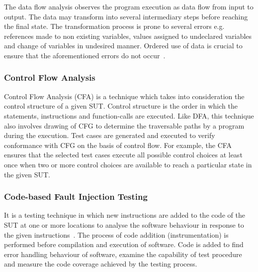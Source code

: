 The data flow analysis observes the program execution as data flow from input to output. The data may transform into several intermediary steps before reaching the final state. The transformation process is prone to several errors e.g. references made to non existing variables, values assigned to undeclared variables and change of variables in undesired manner. Ordered use of data is crucial to ensure that the aforementioned errors do not occur~\cite{fosdick1976data}.

\subsubsection{Control Flow Analysis}
Control Flow Analysis (CFA) is a technique which takes into consideration the control structure of a given SUT. Control structure is the order in which the statements, instructions and function-calls are executed. Like DFA, this technique also involves drawing of CFG to determine the traversable paths by a program during the execution. Test cases are generated and executed to verify conformance with CFG on the basis of control flow. For example, the CFA ensures that the selected test cases execute all possible control choices at least once when two or more control choices are available to reach a particular state in the given SUT. %

\subsubsection{Code-based Fault Injection Testing}
It is a testing technique in which new instructions are added to the code of the SUT at one or more locations to analyse the software behaviour in response to the given instructions~\cite{voas1997software}. The process of code addition (instrumentation) is performed before compilation and execution of software. Code is added to find error handling behaviour of software, examine the capability of test procedure and measure the code coverage achieved by the testing process.    

